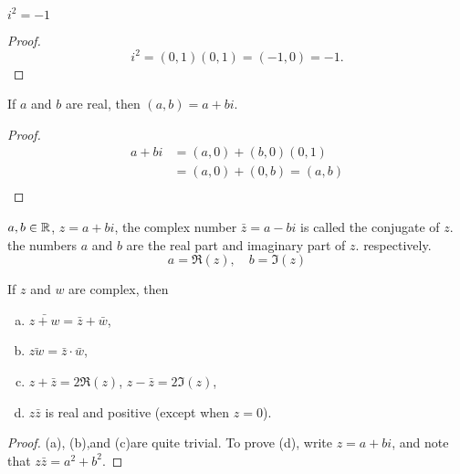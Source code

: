 \begin{thm}
    \label{thm:1.28}
    $i^2=-1$
\end{thm}

\begin{proof}
    \begin{equation*}
        i^2=(0,1)(0,1)=(-1,0)=-1.
    \end{equation*}
\end{proof}

\begin{thm}
    \label{thm:1.29}
    If $a$ and $b$ are real, then $(a,b) =a + bi$.
\end{thm}

\begin{proof}
    \begin{align*}
        a+bi
        &=(a,0)+(b,0)(0,1)\\
        &=(a,0)+(0,b)=(a,b)\\
    \end{align*}
\end{proof}

\begin{mydef}
    \label{def:1.30}
    $a,b\in {\protect\mathbb R}$, $z = a + bi$,
    the complex number $\bar{z} = a  -bi$ is called the conjugate of $z$.
    the numbers $a$ and $b$ are the real part and imaginary part of $z$.
    respectively.
    \begin{equation*}
        a=\Re(z), \quad
        b=\Im(z)
    \end{equation*}
\end{mydef}

\begin{thm}
    \label{thm:1.31}
    If $z$ and $w$ are complex, then
    \begin{enumerate}[(a)]
        \item $\bar{z+w}=\bar{z}+\bar{w}$,
        \item $\bar{zw}=\bar{z}\cdot\bar{w}$,
        \item $z+\bar{z}=2\Re(z)$, $z-\bar{z}=2\Im(z)$,
        \item $z\bar{z}$ is real and positive (except when $z=0$).
    \end{enumerate}
\end{thm}

\begin{proof}
    (a), (b),and (c)are quite trivial.
    To prove (d), write $z = a + bi$,
    and note that $z\bar{z} = a^2 + b^2$.
\end{proof}


